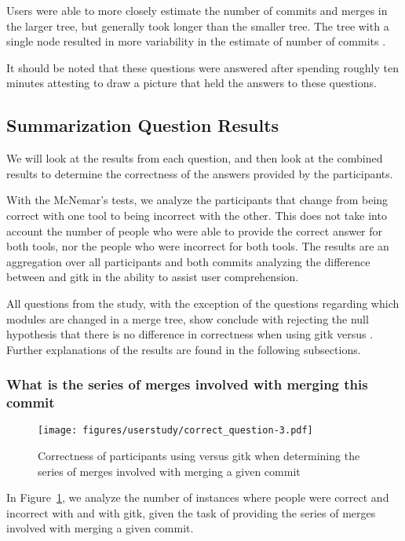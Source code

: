 Users were able to more closely estimate the number of commits and
merges in the larger tree, but generally took longer than the smaller
tree. The tree with a single node resulted in more variability in the
estimate of number of commits .

It should be noted that these questions were answered after spending
roughly ten minutes attesting to draw a picture that held the answers to
these questions.

\subsection{Summarization Question Results}

We will look at the results from each question, and then look at the
combined results to determine the correctness of the answers provided by
the participants.

With the McNemar's tests, we analyze the participants that change from
being correct with one tool to being incorrect with the other. This does
not take into account the number of people who were able to provide the
correct answer for both tools, nor the people who were incorrect for both
tools. The results are an aggregation over all participants and both
commits analyzing the difference between \tool and gitk in the ability
to assist user comprehension.

All questions from the study, with the exception of the questions
regarding which modules are changed in a merge tree, show conclude with
rejecting the null hypothesis that there is no difference in correctness
when using gitk versus \tool. Further explanations of the results are
found in the following subsections.

\subsubsection{What is the series of merges involved with merging this commit}
\label{ssub:what_is_the_series_of_merges_involved_with_merging_this_commit}

\begin{figure}[htpb]
  \centering
  \texttt{[image: figures/userstudy/correct\_question-3.pdf]}
  \caption{Correctness of participants using \tool versus gitk
    when determining the series of merges involved with merging a given
  commit}
  \label{fig:q_3_correctness}
\end{figure}

In Figure~\ref{fig:q_3_correctness}, we analyze the number of instances
where people were correct and incorrect with \tool and with gitk, given
the task of providing the series of merges involved with merging a given
commit.

